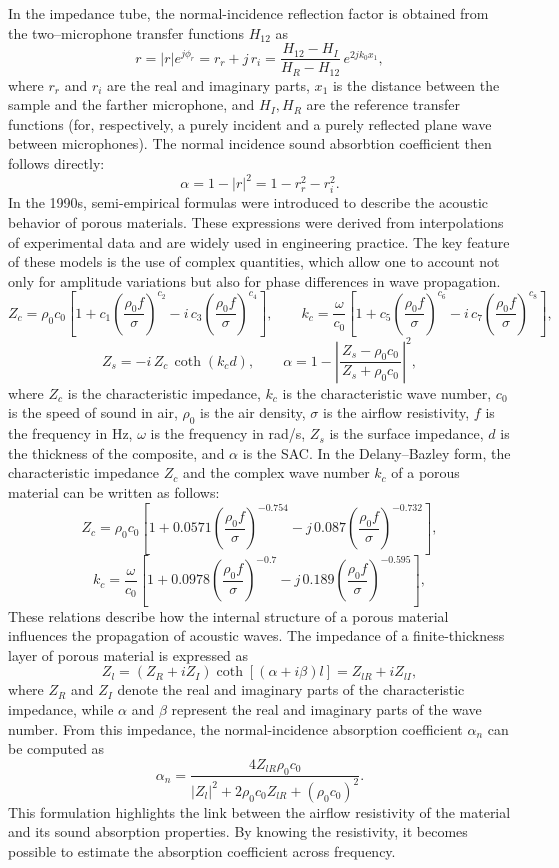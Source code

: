 In the impedance tube, the normal-incidence reflection factor is obtained from the two–microphone transfer functions \(H_{12}\) as 
\[
r=\lvert r\rvert e^{j\phi_r}=r_r+j\,r_i=\frac{H_{12}-H_I}{H_R-H_{12}}\,e^{2j k_0 x_1},
\]
where \(r_r\) and \(r_i\) are the real and imaginary parts, \(x_1\) is the distance between the sample and the farther microphone, and \(H_I,H_R\) are the reference transfer functions (for, respectively, a purely incident and a purely reflected plane wave between microphones). The normal incidence sound absorbtion coefficient then follows directly:
\[
\alpha = 1-\lvert r\rvert^2 = 1-r_r^2-r_i^2 .
\]
In the 1990s, semi-empirical formulas were introduced to describe the acoustic behavior of porous materials. These expressions were derived from interpolations of experimental data and are widely used in engineering practice. The key feature of these models is the use of complex quantities, which allow one to account not only for amplitude variations but also for phase differences in wave propagation. 
\[
Z_c=\rho_0 c_0\!\left[1+c_1\!\left(\frac{\rho_0 f}{\sigma}\right)^{c_2}\!-i\,c_3\!\left(\frac{\rho_0 f}{\sigma}\right)^{c_4}\right],\qquad
k_c=\frac{\omega}{c_0}\!\left[1+c_5\!\left(\frac{\rho_0 f}{\sigma}\right)^{c_6}\!-i\,c_7\!\left(\frac{\rho_0 f}{\sigma}\right)^{c_8}\right],
\]
\[
Z_s=-i\,Z_c\,\coth(k_c d),\qquad
\alpha = 1-\left|\frac{Z_s-\rho_0 c_0}{\,Z_s+\rho_0 c_0\,}\right|^2,
\]
where \(Z_c\) is the characteristic impedance, \(k_c\) is the characteristic wave number, \(c_0\) is the speed of sound in air, \(\rho_0\) is the air density, \(\sigma\) is the airflow resistivity, \(f\) is the frequency in Hz, \(\omega\) is the frequency in rad/s, \(Z_s\) is the surface impedance, \(d\) is the thickness of the composite, and \(\alpha\) is the SAC.
In the Delany–Bazley form, the characteristic impedance $Z_c$ and the complex wave number $k_c$ of a porous material can be written as follows:
\[
Z_c = \rho_0 c_0 \left[ 1 + 0.0571 \left( \frac{\rho_0 f}{\sigma} \right)^{-0.754}
      - j\,0.087 \left( \frac{\rho_0 f}{\sigma} \right)^{-0.732} \right],
\]
\[
k_c = \frac{\omega}{c_0} \left[ 1 + 0.0978 \left( \frac{\rho_0 f}{\sigma} \right)^{-0.7}
      - j\,0.189 \left( \frac{\rho_0 f}{\sigma} \right)^{-0.595} \right],
\]
These relations describe how the internal structure of a porous material influences the propagation of acoustic waves.
The impedance of a finite-thickness layer of porous material is expressed as
\[
Z_l = (Z_R + iZ_I)\coth[(\alpha + i\beta)l] = Z_{lR} + iZ_{lI},
\]
where $Z_R$ and $Z_I$ denote the real and imaginary parts of the characteristic impedance, while $\alpha$ and $\beta$ represent the real and imaginary parts of the wave number. From this impedance, the normal-incidence absorption coefficient $\alpha_n$ can be computed as
\[
\alpha_n = \frac{4Z_{lR}\rho_0 c_0}{|Z_l|^2 + 2\rho_0 c_0 Z_{lR} + (\rho_0 c_0)^2}.
\]
This formulation highlights the link between the airflow resistivity of the material and its sound absorption properties. By knowing the resistivity, it becomes possible to estimate the absorption coefficient across frequency.


